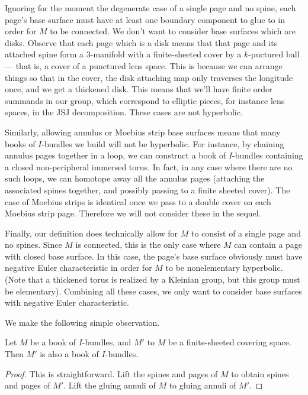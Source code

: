 Ignoring for the moment the degenerate case of a single page and no spine, each
page's base surface must have at least one boundary component to glue to in
order for $M$ to be connected. We don't want to consider base surfaces which
are disks.  Observe that each page which is a disk means that that page and its
attached spine form a $3$-manifold with a finite-sheeted cover by
a $k$-puctured ball --- that is, a cover of a punctured lens space. This is
because we can arrange things so that in the cover, the disk attaching map only
traverses the longitude once, and we get a thickened disk.  This means that
we'll have finite order summands in our group, which correspond to elliptic
pieces, for instance lens spaces, in the JSJ decomposition. These cases are not
hyperbolic.

Similarly, allowing annulus or Moebius strip base surfaces means that many
books of $I$-bundles we build will not be hyperbolic. For instance, by chaining
annulus pages together in a loop, we can construct a book of $I$-bundles
containing a closed non-peripheral immersed torus. In fact, in any case where
there are no such loops, we can homotope away all the annulus pages (attaching
the associated spines together, and possibly passing to a finite sheeted
cover).  The case of Moebius strips is identical once we pass to a double cover
on each Moebius strip page. Therefore we will not consider these in the sequel.

Finally, our definition does technically allow for $M$ to consist of a single
page and no spines. Since $M$ is connected, this is the only case where $M$ can
contain a page with closed base surface. In this case, the page's base surface
obviously must have negative Euler characteristic in order for $M$ to be
nonelementary hyperbolic. (Note that a thickened torus is realized by
a Kleinian group, but this group must be elementary). Combining all these
cases, we only want to consider base surfaces with negative Euler
characteristic.

We make the following simple observation.

\begin{prop}

Let $M$ be a book of $I$-bundles, and $M'$ to $M$ be a finite-sheeted covering
space.  Then $M'$ is also a book of $I$-bundles.

\end{prop}

\begin{proof}

This is straightforward. Lift the spines and pages of $M$ to obtain spines and
pages of $M'$. Lift the gluing annuli of $M$ to gluing annuli of $M'$.

\end{proof}

